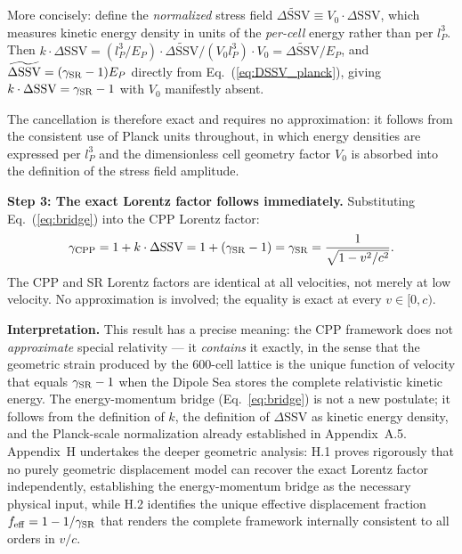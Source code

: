 \documentclass[11pt,letterpaper]{article}
\begin{document}
More concisely: define the \emph{normalized} stress field 
$\widetilde{\Delta\text{SSV}} \equiv V_0 \cdot \Delta\text{SSV}$, 
which measures kinetic energy density in units of the \emph{per-cell} 
energy rather than per $l_P^3$. Then 
$k \cdot \Delta\text{SSV} = (l_P^3/E_P)\cdot\widetilde{\Delta\text{SSV}}/(V_0 l_P^3) 
\cdot V_0 = \widetilde{\Delta\text{SSV}}/E_P$, and 
$\widetilde{\Delta\text{SSV}} = (\gamma_{\rm SR}-1)E_P$ directly from 
Eq.~(\ref{eq:DSSV_planck}), giving $k\cdot\Delta\text{SSV} = \gamma_{\rm SR}-1$ 
with $V_0$ manifestly absent.


The cancellation is therefore exact and requires no approximation: it follows from the consistent use of Planck units throughout, in which energy densities are expressed per $l_P^3$ and the dimensionless cell geometry factor $V_0$ is absorbed into the definition of the stress field amplitude.

\textbf{Step 3: The exact Lorentz factor follows immediately.}
Substituting Eq.~(\ref{eq:bridge}) into the CPP Lorentz factor:
\begin{equation}
\gamma_{\rm CPP} = 1 + k\cdot\Delta\text{SSV} = 1 + (\gamma_{\rm SR}-1) 
= \gamma_{\rm SR} = \frac{1}{\sqrt{1-v^2/c^2}}.
\label{eq:gamma_exact}
\end{equation}
The CPP and SR Lorentz factors are identical at all velocities, not merely at low velocity. No approximation is involved; the equality is 
exact at every $v \in [0,c)$.

\textbf{Interpretation.}
This result has a precise meaning: the CPP framework does not \emph{approximate} special relativity — it \emph{contains} it exactly, in the sense that the geometric strain produced by the 600-cell lattice is the unique function of velocity that equals $\gamma_{\rm SR} - 1$ when the Dipole Sea stores the complete relativistic kinetic energy. The energy-momentum bridge (Eq.~\ref{eq:bridge}) is not a new postulate; 
it follows from the definition of $k$, the definition of $\Delta\text{SSV}$ as kinetic energy density, and the Planck-scale normalization already established in Appendix~A.5. Appendix~H undertakes the deeper geometric analysis: H.1 proves rigorously that no purely geometric displacement model can recover the 
exact Lorentz factor independently, establishing the energy-momentum bridge as the necessary physical input, while H.2 identifies the unique effective displacement fraction $f_{\rm eff} = 1 - 1/\gamma_{\rm SR}$ that renders the complete framework internally consistent to all orders in $v/c$.
\end{document}
